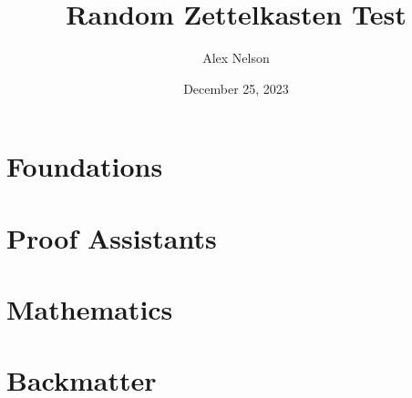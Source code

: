 \documentclass[dvipsnames,HTML]{amsbook}
\title{Random Zettelkasten Test}
\author{Alex Nelson}
\date{December 25, 2023}
\begin{document}
\frontmatter
\maketitle
\tableofcontents
\listofpuzzles

\mainmatter
\vfill\eject

\part{Foundations}










\part{Proof Assistants}









\part{Mathematics}





\backmatter
\part{Backmatter}
\appendix


\unappendix
\nocite{*}

\end{document}
